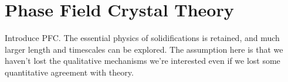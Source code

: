 \section{Phase Field Crystal Theory} %

{\color{ForestGreen} {\bfseries


Introduce PFC. The essential physics of solidifications is retained,
and much larger length and timescales can be explored. The assumption
here is that we haven't lost the qualitative mechanisms we're
interested even if we lost some quantitative agreement with theory.} }
